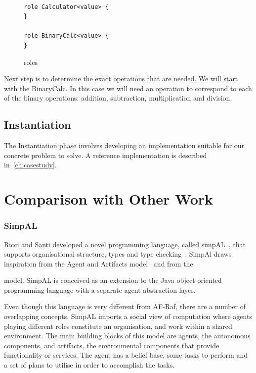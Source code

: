 \documentclass[a4paper,12pt,oneside,fleqn]{book} %
\newcommand{\todo}[1]{[\textcolor{red}{TODO}: #1]}
\begin{document}
{\begin{figure}\footnotesize %
\begin{verbatim}

role Calculator<value> {
}

role BinaryCalc<value> {
}

\end{verbatim}
\caption{roles}
\label{fig:c-roles}
\end{figure} %

Next step is to determine the exact operations that are needed. We will
start with the BinaryCalc. In this case we will need an operation to
correspond to each of the binary operations: addition, subtraction,
multiplication and division.


\subsection{Instantiation} %
The Instantiation phase involves developing an implementation suitable for
our concrete problem to solve. A reference implementation is described
in~\autoref{ch:casestudy}.

\section{Comparison with Other Work}\label{ch:related} %

\subsubsection{SimpAL} %
Ricci  and Santi developed a novel programming language, called
simpAL~\cite{DBLP:conf/oopsla/RicciS11,DBLP:conf/oopsla/RicciS12}, that
supports organisational structure, types and type
checking~\cite{DBLP:conf/promas/RicciS12}. SimpAl draws inspiration from
the Agent and Artifacts model~\cite{DBLP:conf/atal/RicciVO07} and from the

model. SimpAL is conceived as an extension to the Java object oriented
programming language with a separate agent abstraction layer.

Even though this language is very different from AF-Raf, there are a number
of overlapping concepts. SimpAL imports a social view of computation where
agents playing different roles constitute an organisation, and work within
a shared environment. The main building blocks of this model are agents,
the autonomous components, and artifacts, the environmental components that
provide functionality or services. The agent has a belief base, some tasks
to perform and a set of plans to utilise in order to accomplish the tasks.

}
\end{document}
